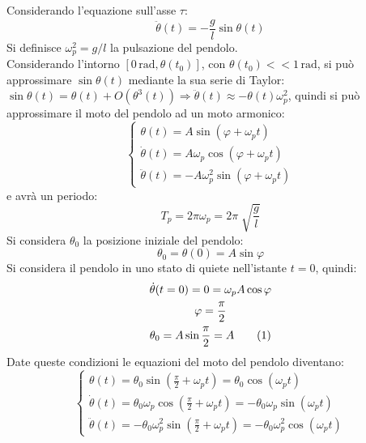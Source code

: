 \documentclass{article}
\numberwithin{equation}{subsection}
\begin{document}
Considerando l'equazione sull'asse $\tau$: 
\begin{equation}
    \ddot\theta(t)=-\displaystyle\frac{g}{l}\sin\theta(t)
\end{equation}
Si definisce $\omega_p^{2}=g/l$ la pulsazione del pendolo.
\\
Considerando l'intorno $[0\,\mathrm{rad},\theta(t_0)]$, 
con $\theta(t_0) << 1\,\mathrm{rad}$, 
si può approssimare $\sin\theta(t)$ mediante la sua serie di Taylor: 
$\sin\theta(t) = \theta(t)+O(\theta^{3}(t))\Rightarrow\ddot\theta(t)\approx-\theta(t)\omega_p^{2}$, 
quindi si può approssimare il moto del pendolo ad un moto 
armonico: 
\begin{equation*}
    \begin{cases}
        \theta(t)=A\sin(\varphi+\omega_pt)\\
        \dot\theta(t)=A\omega_p\cos(\varphi+\omega_pt)\\
        \ddot\theta(t)=-A\omega_p^{2}\sin(\varphi+\omega_pt)
    \end{cases}
\end{equation*}
e avrà un periodo:
\begin{equation} 
    T_p =2\pi\omega_p=2\pi\displaystyle\sqrt[]{\frac{g}{l}}
\end{equation}
Si considera $\theta_0$ la posizione iniziale del 
pendolo: 
\begin{equation*}
    \theta_0=\theta(0)=A\sin\varphi
\end{equation*}
Si considera il pendolo in uno stato di quiete nell'istante $t=0$, 
quindi:
\begin{gather*}
    \dot\theta(t=0)=0=\omega_pA\cos\varphi\\
    \varphi=\displaystyle\frac{\pi}{2}\\
    \theta_0=A\sin\frac{\pi}{2}=A\tag{\stepcounter{equation}\theequation}
\end{gather*}
Date queste condizioni le equazioni del moto del pendolo diventano: 
\begin{equation*}
    \begin{cases}
        \displaystyle\theta(t)=\theta_0\sin\left(\frac{\pi}{2}+\omega_pt\right)=\theta_0\cos(\omega_pt)\\
        \displaystyle\dot\theta(t)=\theta_0\omega_p\cos\left(\frac{\pi}{2}+\omega_pt\right)=-\theta_0\omega_p\sin(\omega_pt)\\
        \displaystyle\ddot\theta(t)=-\theta_0\omega_p^{2}\sin\left(\frac{\pi}{2}+\omega_pt\right)=-\theta_0\omega_p^{2}\cos(\omega_pt)
    \end{cases}
\end{equation*}
\end{document}
